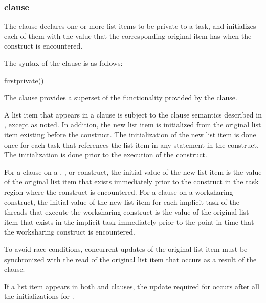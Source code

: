 \subsubsection{ clause}
\label{subsubsec:firstprivate clause}
\summary
The  clause declares one or more list items to be private to a task, and 
initializes each of them with the value that the corresponding original item has when the 
construct is encountered. 

\syntax
The syntax of the  clause is as follows:

\begin{boxedcode}
firstprivate()
\end{boxedcode}

\descr
The  clause provides a superset of the functionality provided by the 
 clause. 

A list item that appears in a  clause is subject to the  clause 
semantics described in 
, 
except as noted. In addition, the 
new list item is initialized from the original list item existing before the construct. The 
initialization of the new list item is done once for each task that references the list item 
in any statement in the construct. The initialization is done prior to the execution of the 
construct.

For a  clause on a , , or  construct, the initial 
value of the new list item is the value of the original list item that exists immediately 
prior to the construct in the task region where the construct is encountered. For a 
 clause on a worksharing construct, the initial value of the new list 
item for each implicit task of the threads that execute the worksharing construct is the 
value of the original list item that exists in the implicit task immediately prior to the 
point in time that the worksharing construct is encountered.

To avoid race conditions, concurrent updates of the original list item must be 
synchronized with the read of the original list item that occurs as a result of the 
 clause.

If a list item appears in both  and  clauses, the update 
required for  occurs after all the initializations for .


